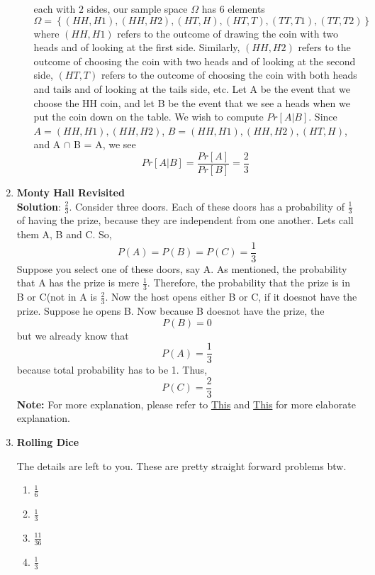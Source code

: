 \documentclass[11pt]{article}
\begin{document}
\begin{enumerate}
\begin{enumerate}
				each with $2$ sides, our sample space $\Omega$ has $6$ elements
				$$\Omega = \left\{(HH,H1),(HH,H2),(HT,H),(HT,T),(TT,T1),(TT,T2)\right\}$$
				where $(HH,H1)$ refers to the outcome of drawing the coin with two heads and of looking at the first
				side. Similarly, $(HH,H2)$ refers to the outcome of choosing the coin with two heads and of looking at
				the second side, $(HT,T)$ refers to the outcome of choosing the coin with both heads and tails and of
				looking at the tails side, etc. Let A be the event that we choose the HH coin, and let B be the event
				that we see a heads when we put the coin down on the table. We wish to compute $Pr[A \vert B]$. Since
				$A = {(HH,H1),(HH,H2)}$, $B = {(HH,H1),(HH,H2),(HT,H)}$, and A $\cap$ B = A, we see
				$$Pr[A \vert B] = \frac{Pr[A]}{Pr[B]} = \frac{2}{3} $$

				
			\end{enumerate}
		
		\item \textbf{Monty Hall Revisited} \\
		\textbf{Solution}: $\frac{2}{3}$. Consider three doors. Each of these doors has a probability of $\frac{1}{3}$ of having the prize, because they are independent from one another. Lets call them A, B and C. So, 
					$$P(A) = P(B) = P(C) = \frac{1}{3}$$
		Suppose you select one of these doors, say A. As mentioned, the probability that A has the prize is mere $\frac{1}{3}$. Therefore, the probability that the prize is in B or C(not in A is $\frac{2}{3}$. Now the host opens either B or C, if it doesnot have the prize. Suppose he opens B. Now because B doesnot have the prize, the 
							$$P(B) = 0$$
		but we already know that 
							$$P(A) = \frac{1}{3}$$ 
		because total probability has to be 1. Thus, 
							$$P(C) = \frac{2}{3}$$
		\textbf{Note: } For more explanation, please refer to \href{https://www.youtube.com/watch?v=4Lb-6rxZxx0}{This} and \href{http://www.archive.org/download/MIT6.042JF10/MIT6_042JF10_lec18_300k.mp4}{This} for more elaborate explanation. 
		
		\item \textbf{Rolling Dice}
			
			The details are left to you. These are pretty straight forward problems btw. 
			\begin{enumerate}
				\item $\frac{1}{6}$
				\item $\frac{1}{3}$
				\item $\frac{11}{36}$
				\item $\frac{1}{3}$
			\end{enumerate}
		
		
	\end{enumerate}
	
\end{document}
